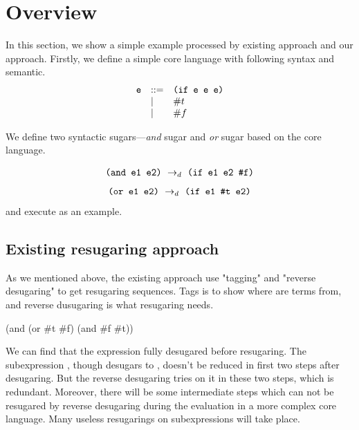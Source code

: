 \section{Overview}
\label{sec2}

In this section, we show a simple example processed by existing approach and our approach. Firstly, we define a simple core language with following syntax and semantic.
\[
\begin{array}{lll}
\mbox{\tt e} &::=& \texttt{(if~e~e~e)}\\
& |& \#t\\
& |& \#f
\end{array}
\]

{\rightarrow{}}

We define two syntactic sugars---\emph{and} sugar and \emph{or} sugar based on the core language.

\[
\texttt{(and e1 e2)} ~\rightarrow_d~ \texttt{(if e1 e2 \#f)}
\]
\[
\texttt{(or e1 e2)} ~\rightarrow_d~ \texttt{(if e1 \#t e2)}
\]
and execute  as an example.

\subsection{Existing resugaring approach}
As we mentioned above, the existing approach use "tagging" and "reverse desugaring" to get resugaring sequences. Tags is to show where are terms from, and reverse dusugaring is what resugaring needs.

\begin{Codes}
    (and (or \#t \#f) (and \#f \#t))
  
 
 
 
\end{Codes}

We can find that the expression fully desugared before resugaring. The subexpression , though desugars to , doesn't be reduced in first two steps after desugaring. But the reverse desugaring tries on it in these two steps, which is redundant. Moreover, there will be some intermediate steps which can not be resugared by reverse desugaring during the evaluation in a more complex core language. Many useless resugarings on subexpressions will take place.

